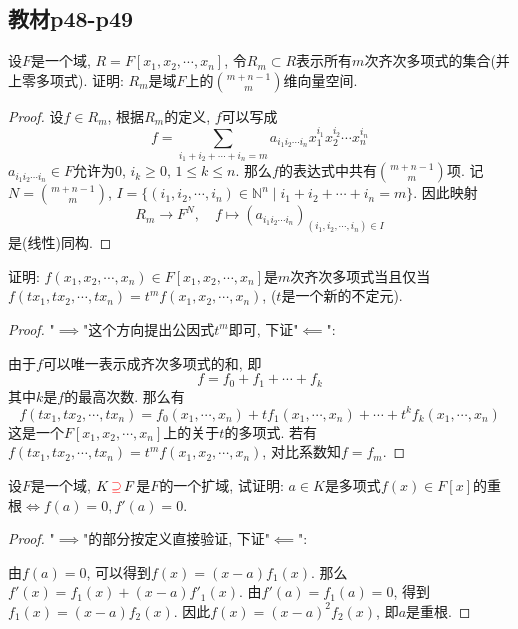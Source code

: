 \subsection{教材p48-p49}

\begin{problem}
    设$F$是一个域, $R = F[x_1, x_2, \cdots, x_n]$, 令$R_m \subset R$表示所有$m$次齐次多项式的集合(并上零多项式). 证明: $R_m$是域$F$上的$\binom{m + n - 1}{m}$维向量空间.
\end{problem}

\begin{proof}
    设$f \in R_m$, 根据$R_m$的定义, $f$可以写成
    \[
        f = \sum_{i_1 + i_2 + \cdots + i_n = m} a_{i_1i_2 \cdots i_n}x_1^{i_1}x_2^{i_2} \cdots x_n^{i_n}
    \]
    $a_{i_1i_2 \cdots i_n} \in F$允许为$0$, $i_k \geqslant 0,\, 1 \leqslant k \leqslant n$. 那么$f$的表达式中共有$\binom{m + n - 1}{m}$项. 记$N = \binom{m + n - 1}{m}$, $I = \{(i_1, i_2, \cdots, i_n) \in \mathbb{N}^n \mid i_1 + i_2 + \cdots + i_n = m\}$. 因此映射
    \[
        R_m \to F^{N},\quad f \mapsto (a_{i_1i_2 \cdots i_n})_{(i_1, i_2, \cdots, i_n) \in I}
    \]
    是(线性)同构.
\end{proof}

\begin{problem}
    证明: $f(x_1, x_2, \cdots, x_n) \in F[x_1, x_2, \cdots, x_n]$是$m$次齐次多项式当且仅当$f(tx_1, tx_2, \cdots, tx_n) = t^mf(x_1, x_2, \cdots, x_n)$, ($t$是一个新的不定元).
\end{problem}

\begin{proof}
    "$\implies$"这个方向提出公因式$t^m$即可, 下证"$\impliedby$":

    由于$f$可以唯一表示成齐次多项式的和, 即
    \[
        f = f_0 + f_1 + \cdots + f_k
    \]
    其中$k$是$f$的最高次数. 那么有
    \[
        f(tx_1, tx_2, \cdots, tx_n) = f_0(x_1, \cdots, x_n) + tf_1(x_1, \cdots, x_n) + \cdots + t^kf_k(x_1, \cdots, x_n)
    \]
    这是一个$F[x_1, x_2, \cdots, x_n]$上的关于$t$的多项式. 若有$f(tx_1, tx_2, \cdots, tx_n) = t^mf(x_1, x_2, \cdots, x_n)$, 对比系数知$f = f_m$.
\end{proof}

\begin{problem}
    设$F$是一个域, $K \,\textcolor{red}{\supseteq}\, F$是$F$的一个扩域, 试证明: $a \in K$是多项式$f(x) \in F[x]$的重根$\Leftrightarrow f(a) = 0, f'(a) = 0$.
\end{problem}

\begin{proof}
    "$\implies$"的部分按定义直接验证, 下证"$\impliedby$":

    由$f(a) = 0$, 可以得到$f(x) = (x - a)f_1(x)$. 那么$f'(x) = f_1(x) + (x - a)f'_1(x)$. 由$f'(a) = f_1(a) = 0$, 得到$f_1(x) = (x - a)f_2(x)$. 因此$f(x) = (x - a)^2f_2(x)$, 即$a$是重根.
\end{proof}

